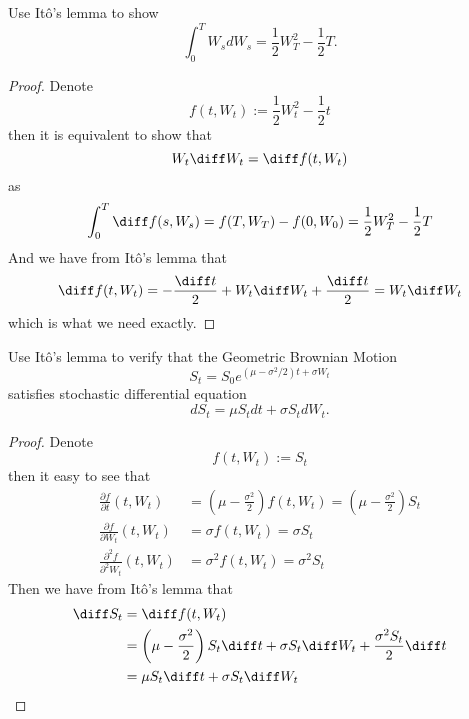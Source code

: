 \newcommand{\trans}{\mathrm T}

    \problem
    \begin{question}
        Use It\^o's lemma to show
        \[\int_0^T W_sdW_s=\frac{1}{2}W^2_T-\frac{1}{2}T.\]
    \end{question}
    \begin{proof}
        Denote
        \[f(t,W_t):=\frac{1}{2}W_t^2-\frac{1}{2}t\]
        then it is equivalent to show that
        \[W_t\diff W_t=\diff f(t,W_t)\]
        as
        \[\int_0^T\diff f(s,W_s)=f(T,W_T)-f(0,W_0)=
        \frac{1}{2}W_T^2-\frac{1}{2}T\]
        And we have from It\^o's lemma that
        \[\diff f(t,W_t)=-\frac{\diff t}{2}+W_t\diff W_t
        +\frac{\diff t}{2}=W_t\diff W_t\]
        which is what we need exactly.
    \end{proof}

    \problem
    \begin{question}
        Use It\^o's lemma to verify that the Geometric Brownian Motion
        \[S_t=S_0e^{(\mu-\sigma^2/2)t+\sigma W_t}\]
        satisfies stochastic differential equation
        \[dS_t= \mu S_t dt+\sigma S_tdW_t.\]
    \end{question}
    \begin{proof}
        Denote
        \[f(t,W_t):=S_t\]
        then it easy to see that
        \[\begin{aligned}
            \frac{\partial f}{\partial t}(t,W_t)
            &=\left(\mu-\frac{\sigma^2}{2}\right)f(t,W_t)
            =\left(\mu-\frac{\sigma^2}{2}\right)S_t\\
            \frac{\partial f}{\partial W_t}(t,W_t)
            &=\sigma f(t,W_t)=\sigma S_t\\
            \frac{\partial^2 f}{\partial^2 W_t}(t,W_t)
            &=\sigma^2 f(t,W_t)=\sigma^2 S_t
        \end{aligned}\]
        Then we have from It\^o's lemma that
        \[\begin{aligned}
            \diff S_t&=\diff f(t,W_t)\\
            &=\left(\mu-\frac{\sigma^2}{2}\right)S_t\diff t
            +\sigma S_t\diff W_t+\frac{\sigma^2 S_t}{2}\diff t\\
            &=\mu S_t\diff t+\sigma S_t\diff W_t
        \end{aligned}\]
    \end{proof}

